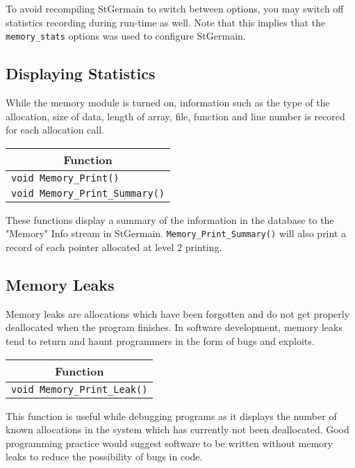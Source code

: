 \documentclass[a4paper,12pt]{article}
\begin{document}
To avoid recompiling StGermain to switch between options, you may switch off statistics recording during run-time as well. Note that this implies that the \verb:memory_stats: options was used to configure StGermain.

\subsection{Displaying Statistics}
While the memory module is turned on, information such as the type of the allocation, size of data, length of array, file, function and line number is recored for each allocation call.

\begin{table}[h]
  \begin{tabular}{|p{13.3cm}|}
    \hline \multicolumn{1}{|c|}{\textbf{Function}} \\ \hline
    \texttt{void Memory\_Print()} \\ \hline
    \texttt{void Memory\_Print\_Summary()} \\ \hline
  \end{tabular}
\end{table}

These functions display a summary of the information in the database to the "Memory" Info stream in StGermain. \verb:Memory_Print_Summary(): will also print a record of each pointer allocated at level 2 printing.

\subsection{Memory Leaks}
Memory leaks are allocations which have been forgotten and do not get properly deallocated when the program finishes. In software development, memory leaks tend to return and haunt programmers in the form of bugs and exploits.

\begin{table}[h]
  \begin{tabular}{|p{13.3cm}|}
    \hline \multicolumn{1}{|c|}{\textbf{Function}} \\ \hline
    \texttt{void Memory\_Print\_Leak()} \\ \hline
  \end{tabular}
\end{table}

This function is useful while debugging programs as it displays the number of known allocations in the system which has currently not been deallocated. Good programming practice would suggest software to be written without memory leaks to reduce the possibility of bugs in code.
\end{document}
